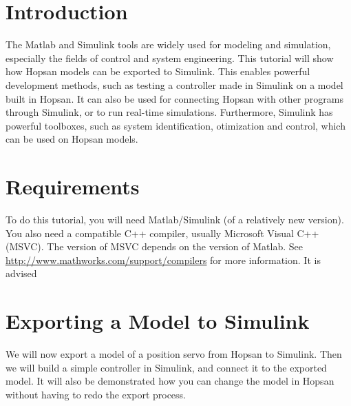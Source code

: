 \documentclass[a4paper]{article}
\begin{document}

\section*{Introduction}
The Matlab and Simulink tools are widely used for modeling and simulation, especially the fields of control and system engineering. 
This tutorial will show how Hopsan models can be exported to Simulink.
This enables powerful development methods, such as testing a controller made in Simulink on a model built in Hopsan.
It can also be used for connecting Hopsan with other programs through Simulink, or to run real-time simulations.
Furthermore, Simulink has powerful toolboxes, such as system identification, otimization and control, which can be used on Hopsan models.

\section*{Requirements}
To do this tutorial, you will need Matlab/Simulink (of a relatively new version).
You also need a compatible C++ compiler, usually Microsoft Visual C++ (MSVC).
The version of MSVC depends on the version of Matlab.
See \url{http://www.mathworks.com/support/compilers} for more information.
It is advised 


\section*{Exporting a Model to Simulink}
We will now export a model of a position servo from Hopsan to Simulink.
Then we will build a simple controller in Simulink, and connect it to the exported model.
It will also be demonstrated how you can change the model in Hopsan without having to redo the export process.
\end{document}
